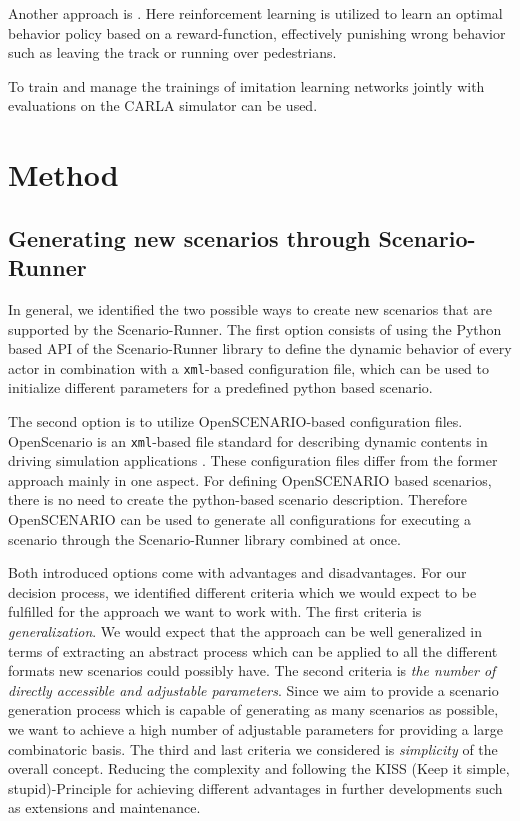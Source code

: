 \documentclass[conference, a4paper, 11pt]{IEEEtran}
\begin{document}
Another approach is  \cite{Toromanoff_2020_CVPR}. Here reinforcement learning is utilized to learn an optimal behavior policy based on a reward-function, effectively punishing wrong behavior such as leaving the track or running over pedestrians.

To train and manage the trainings of imitation learning networks jointly with evaluations on the CARLA simulator  \cite{felipecode:coiltraine} can be used.

\section{Method}

\subsection{Generating new scenarios through Scenario-Runner}
In general, we identified the two possible ways to create new scenarios that are supported by the Scenario-Runner.
The first option consists of using the Python based API of the Scenario-Runner library to define the dynamic behavior of every actor in combination with a \texttt{xml}-based configuration file, which can be used to initialize different parameters for a predefined python based scenario.

The second option is to utilize OpenSCENARIO-based configuration files. OpenScenario is an \texttt{xml}-based file standard for describing dynamic contents in driving simulation applications \cite{OpenScenario}. These configuration files differ from the former approach mainly in one aspect. For defining OpenSCENARIO based scenarios, there is no need to create the python-based scenario description. Therefore OpenSCENARIO can be used to generate all configurations for executing a scenario through the Scenario-Runner library combined at once. 

Both introduced options come with advantages and disadvantages. For our decision process, we identified different criteria which we would expect to be fulfilled for the approach we want to work with. 
The first criteria is \textit{generalization}. We would expect that the approach can be well generalized in terms of  extracting an abstract process which can be applied to all the different formats new scenarios could possibly have.
The second criteria is \textit{the number of directly accessible and adjustable parameters}. Since we aim to provide a scenario generation process which is capable of generating as many scenarios as possible, we want to achieve a high number of adjustable parameters for providing a large combinatoric basis.
The third and last criteria we considered is \textit{simplicity} of the overall concept. Reducing the complexity and  following the KISS (Keep it simple, stupid)-Principle for achieving different advantages in further developments such as extensions and maintenance. 
\end{document}
